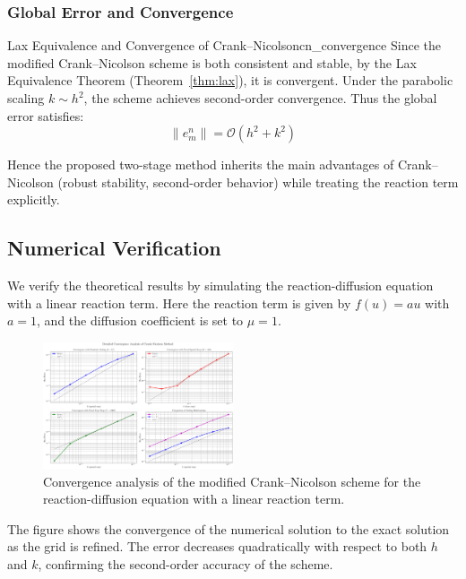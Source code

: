\subsubsection{Global Error and Convergence}

\begin{theorem}{Lax Equivalence and Convergence of Crank--Nicolson}{cn_convergence}
  Since the modified Crank--Nicolson scheme is both consistent and stable, by the Lax Equivalence Theorem
  (Theorem~\ref{thm:lax}), it is convergent. Under the parabolic scaling $k \sim h^2$, the scheme achieves
  second-order convergence. Thus the global error satisfies:
  \[
    \|e_m^n\| = \mathcal{O}\!\left(h^2 + k^2\right)
  \]

\end{theorem}

Hence the proposed two-stage method inherits the main advantages of Crank--Nicolson (robust stability, second-order behavior) while treating the reaction term explicitly.

\subsection{Numerical Verification}
We verify the theoretical results by simulating the reaction-diffusion equation with a linear reaction term.
Here the reaction term is given by \(f(u) = au\) with \(a = 1\), and the diffusion coefficient is set to \(\mu = 1\).

\begin{figure}[H]
  \centering
  \includegraphics[width=0.5\textwidth]{figures/convergence_analysis_2d.png}
  \caption{Convergence analysis of the modified Crank--Nicolson scheme for the reaction-diffusion equation with a linear reaction term.}
  \label{fig:convergence_analysis_2d}
\end{figure}

The figure shows the convergence of the numerical solution to the exact solution as the grid is refined. The error decreases quadratically with respect to both \(h\) and \(k\), confirming the second-order accuracy of the scheme.


